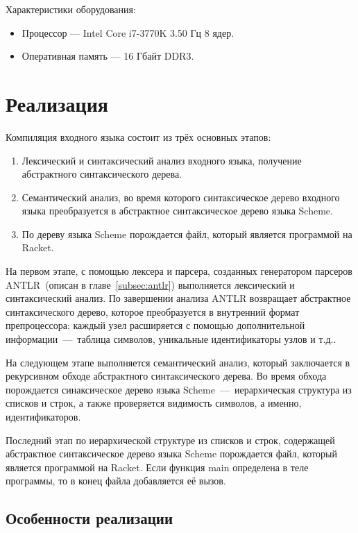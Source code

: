 \documentclass[12pt,a4paper,oneside]{extarticle}
\begin{document}
        \noindent Характеристики оборудования:
        \begin{itemize}
            \item Процессор --- Intel Core i7-3770K 3.50 Гц 8 ядер.
            \item Оперативная память --- 16 Гбайт DDR3.
        \end{itemize}
\clearpage

\section{Реализация}
    Компиляция входного языка состоит из трёх основных этапов: 
    \begin{enumerate}
        \item Лексический и синтаксический анализ входного языка, получение абстрактного синтаксического дерева.
        \item Семантический анализ, во время которого синтаксическое дерево входного языка преобразуется в абстрактное синтаксическое дерево языка Scheme.
        \item По дереву языка Scheme порождается файл, который является программой на Racket.
    \end{enumerate}

    На первом этапе, с помощью лексера и парсера, созданных генератором парсеров ANTLR~(описан в главе~\ref{subsec:antlr}) выполняется лексический и синтаксический анализ.
    По завершении анализа ANTLR возвращает абстрактное синтаксического дерево, которое преобразуется в внутренний формат препроцессора: каждый узел расширяется с помощью дополнительной информации~---~таблица символов, уникальные идентификаторы узлов и т.д..

    На следующем этапе выполняется семантический анализ, который заключается в рекурсивном обходе абстрактного синтаксического дерева.
    Во время обхода порождается синаксическое дерево языка Sсheme~---~иерархическая структура из списков и строк, а также проверяется видимость символов, а именно, идентификаторов.

    Последний этап по иерархической структуре из списков и строк, содержащей абстрактное синтаксическое дерево языка Scheme порождается файл, который является программой на Racket.
    Если функция main определена в теле программы, то в конец файла добавляется её вызов.

    \subsection{Особенности реализации}
\end{document}
